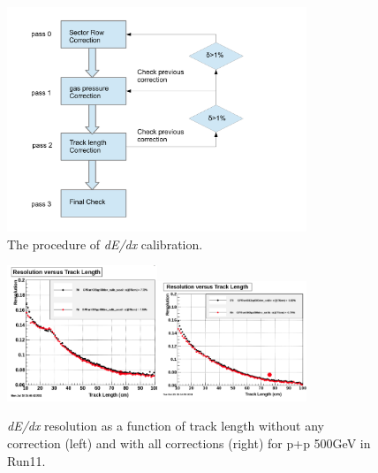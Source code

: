 \begin{figure}
\begin{centering}
\includegraphics[width=0.8\textwidth]{fig/2.Detector/TPC/dEdx_Calib}
\par\end{centering}

\protect\caption{The procedure of\emph{ dE/dx }calibration. }


\label{fig:dEdx_Calib_procedure}
\end{figure}


\begin{figure}
\begin{centering}
\includegraphics[width=0.4\textwidth]{fig/2.Detector/TPC/dEdxRes_pass0}\includegraphics[width=0.4\textwidth]{fig/2.Detector/TPC/dEdxResPass3}
\par\end{centering}

\protect\caption{\emph{dE/dx} resolution as a function of track length without any
correction (left) and with all corrections (right) for p+p 500GeV
in Run11.}


\label{fig:dEdxRes}
\end{figure}



